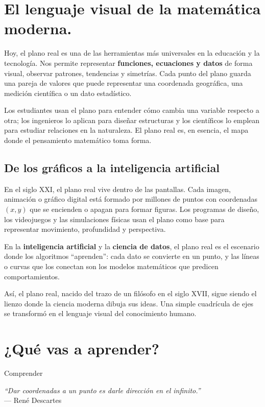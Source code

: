 \section*{El lenguaje visual de la matemática moderna.}
\begin{reseñaplana}
Hoy, el plano real es una de las herramientas más universales en la educación y la tecnología.  
Nos permite representar \textbf{funciones, ecuaciones y datos} de forma visual, observar patrones, tendencias y simetrías.  
Cada punto del plano guarda una pareja de valores que puede representar una coordenada geográfica, una medición 
científica o un dato estadístico.  

Los estudiantes usan el plano para entender cómo cambia una variable respecto a otra; los ingenieros lo aplican 
para diseñar estructuras y los científicos lo emplean para estudiar relaciones en la naturaleza.  
El plano real es, en esencia, el mapa donde el pensamiento matemático toma forma.  

\subsection*{De los gráficos a la inteligencia artificial}  
En el siglo XXI, el plano real vive dentro de las pantallas.  
Cada imagen, animación o gráfico digital está formado por millones de puntos con coordenadas $(x, y)$ que se encienden 
o apagan para formar figuras.  
Los programas de diseño, los videojuegos y las simulaciones físicas usan el plano como base para representar movimiento, 
profundidad y perspectiva.  

En la \textbf{inteligencia artificial} y la \textbf{ciencia de datos}, el plano real es el escenario donde los 
algoritmos “aprenden”: cada dato se convierte en un punto, y las líneas o curvas que los conectan son los modelos 
matemáticos que predicen comportamientos.  

Así, el plano real, nacido del trazo de un filósofo en el siglo XVII, sigue siendo el lienzo donde la ciencia moderna dibuja sus ideas.  
Una simple cuadrícula de ejes se transformó en el lenguaje visual del conocimiento humano.
\end{reseñaplana}


\section*{¿Qué vas a aprender?}
\begin{aprende}
  \item Comprender 
\end{aprende}


\vspace{1cm}
\begin{flushright}
  {\oneptup\itshape ``Dar coordenadas a un punto es darle dirección en el infinito.''}\\
  {\oneptup — René Descartes}
\end{flushright}
